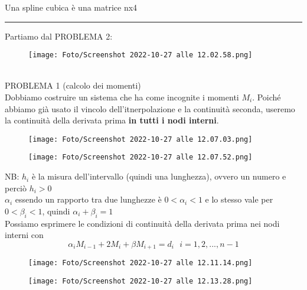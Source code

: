 \documentclass[a4paper, portrait]{book}
\numberwithin{equation}{chapter} %
\newcommand*\sepline{%
  \begin{center}
    \rule[1ex]{.5\textwidth}{.5pt}
  \end{center}}
\begin{document}
Una spline cubica è una matrice nx4
\sepline{}
\newpage
Partiamo dal PROBLEMA 2:
\begin{figure}[h!]
    \centering
    \texttt{[image: Foto/Screenshot 2022-10-27 alle 12.02.58.png]}
    \caption{}
\end{figure}
\\PROBLEMA 1 (calcolo dei momenti)\\
Dobbiamo costruire un sistema che ha come incognite i momenti $M_i$. Poiché abbiamo già usato il vincolo dell'itnerpolazione e la continuità seconda, useremo la continuità della derivata prima \textbf{in tutti i nodi interni}.
\begin{figure}[h!]
    \centering
    \texttt{[image: Foto/Screenshot 2022-10-27 alle 12.07.03.png]}
    \caption{}
\end{figure}
\begin{figure}[h!]
    \centering
    \texttt{[image: Foto/Screenshot 2022-10-27 alle 12.07.52.png]}
    \caption{}
\end{figure}
\newpage
NB: $h_i$ è la misura dell'intervallo (quindi una lunghezza), ovvero un numero e perciò $h_i>0$\\
$\alpha_i$ essendo un rapporto tra due lunghezze è $0<\alpha_i<1$ e lo stesso vale per $0<\beta_i<1$, quindi $\alpha_i + \beta_i = 1$\\
Possiamo esprimere le condizioni di continuità della derivata prima nei nodi interni con
\begin{equation}
    \alpha_i M_{i-1}+2M_i+\beta M_{i+1}=d_i \ \ \ i = 1,2,...,n-1
\end{equation}
\begin{figure}[h!]
    \centering
    \texttt{[image: Foto/Screenshot 2022-10-27 alle 12.11.14.png]}
    \caption{}
\end{figure}
\begin{figure}[h!]
    \centering
    \texttt{[image: Foto/Screenshot 2022-10-27 alle 12.13.28.png]}
    \caption{}
\end{figure}
\newpage
\end{document}
